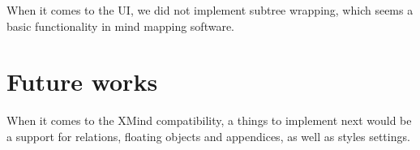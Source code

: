 When it comes to the UI, we did not implement subtree wrapping, which seems a basic functionality in mind mapping software.

\section{Future works}
\label{summary-future}
When it comes to the XMind compatibility, a things to implement next would be a support for relations, floating objects and appendices, as well as styles settings. 





